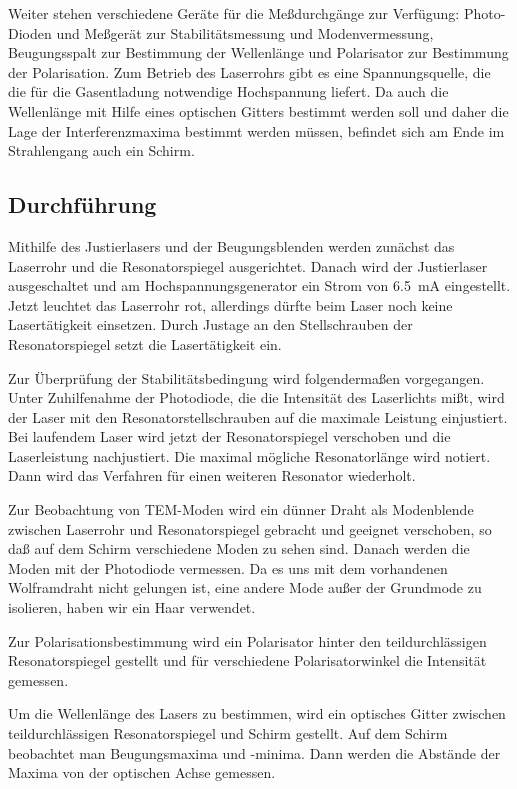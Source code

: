 Weiter stehen verschiedene Geräte für die Meßdurchgänge zur Verfügung:
Photo-Dioden und Meßgerät zur Stabilitätsmessung und Modenvermessung,
Beugungsspalt zur Bestimmung der Wellenlänge und Polarisator zur
Bestimmung der Polarisation.  Zum Betrieb des Laserrohrs gibt es eine
Spannungsquelle, die die für die Gasentladung notwendige Hochspannung
liefert.  Da auch die Wellenlänge mit Hilfe eines optischen Gitters
bestimmt werden soll und daher die Lage der Interferenzmaxima bestimmt
werden müssen, befindet sich am Ende im Strahlengang auch ein Schirm.

\subsection{Durchführung}
Mithilfe des Justierlasers und der Beugungsblenden werden zunächst das
Laserrohr und die Resonatorspiegel ausgerichtet.  Danach wird der
Justierlaser ausgeschaltet und am Hochspannungsgenerator ein Strom von
\SI{6.5}{mA} eingestellt.  Jetzt leuchtet das Laserrohr rot, allerdings
dürfte beim Laser noch keine Lasertätigkeit einsetzen.  Durch Justage an
den Stellschrauben der Resonatorspiegel setzt die Lasertätigkeit ein.

Zur Überprüfung der Stabilitätsbedingung wird folgendermaßen
vorgegangen.  Unter Zuhilfenahme der Photodiode, die die Intensität des
Laserlichts mißt, wird der Laser mit den Resonatorstellschrauben auf die
maximale Leistung einjustiert.  Bei laufendem Laser wird jetzt der
Resonatorspiegel verschoben und die Laserleistung nachjustiert.  Die
maximal mögliche Resonatorlänge wird notiert.  Dann wird das Verfahren
für einen weiteren Resonator wiederholt.

Zur Beobachtung von TEM-Moden wird ein dünner Draht als Modenblende
zwischen Laserrohr und Resonatorspiegel gebracht und geeignet
verschoben, so daß auf dem Schirm verschiedene Moden zu sehen sind.
Danach werden die Moden mit der Photodiode vermessen.  Da es uns mit dem
vorhandenen Wolframdraht nicht gelungen ist, eine andere Mode außer der
Grundmode zu isolieren, haben wir ein Haar verwendet.

Zur Polarisationsbestimmung wird ein Polarisator hinter den
teildurchlässigen Resonatorspiegel gestellt und für verschiedene
Polarisatorwinkel die Intensität gemessen.

Um die Wellenlänge des Lasers zu bestimmen, wird ein optisches Gitter
zwischen teildurchlässigen Resonatorspiegel und Schirm gestellt.  Auf
dem Schirm beobachtet man Beugungsmaxima und -minima.  Dann werden die
Abstände der Maxima von der optischen Achse gemessen.
